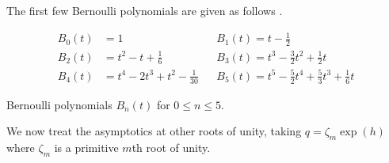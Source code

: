 The first few Bernoulli polynomials are given as follows \cite{BernoulliPolynomial}. 
\begin{table}[h]\label{table: Bernoulli polynomials}
    \begin{align*}
        B_{0}(t)&=1 && B_{1}(t)=t-\frac{1}{2} \\
        B_{2}(t)&=t^{2}-t+\frac{1}{6} && B_{3}(t)=t^{3}-\frac{3}{2}t^{2}+\frac{1}{2}t\\
        B_{4}(t)&=t^{4}-2t^{3}+t^{2}-\frac{1}{30} && B_{5}(t)=t^{5}-\frac{5}{2}t^{4}+\frac{5}{3}t^{3}+\frac{1}{6}t
    \end{align*}
    \caption{Bernoulli polynomials $B_{n}(t)$ for $0\leq n\leq 5$.}
\end{table}

We now treat the asymptotics at other roots of unity, taking $q=\zeta_{m}\exp(h)$ where $\zeta_{m}$ is a primitive $m$th root of unity. 

